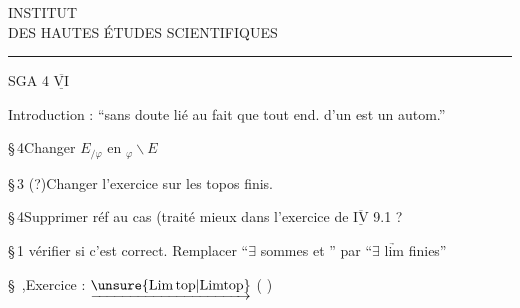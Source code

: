 \begin{center}
INSTITUT\\
DES HAUTES ÉTUDES SCIENTIFIQUES\\
\rule{2.3em}{0.4pt}
\end{center}
SGA 4 $\underline{\overline{\mathrm{VI}}}$

Introduction :   ``sans doute lié au fait que tout end. d'un  est un autom.''\unsure{)}

\S\,4\qquad Changer \(E_{/\varphi}\) en \({}_{\varphi}\backslash E\)

\S\,3 (?)\qquad Changer l'exercice sur les topos finis.

\S\,4\qquad Supprimer réf au cas  (traité mieux dans l'exercice de $\underline{\overline{\mathrm{IV}}}$ 9.1 ?

\S\,1\unsure{,\ldots|,\textendash|\ldots} vérifier si c'est correct. Remplacer ``$\exists$ sommes  et '' par ``$\exists$ $\underrightarrow{\mathrm{lim}}$ finies''

\S\ ,\qquad Exercice : $\underrightarrow{\unsure{\mathrm{Lim\,top}|\mathrm{Limtop}}}$ ( )
